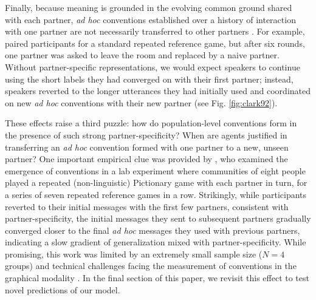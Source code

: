 Finally, because meaning is grounded in the evolving common ground shared with each partner, \emph{ad hoc} conventions established over a history of interaction with one partner are not necessarily transferred to other partners \cite{metzing_when_2003,weber_cultural_2003,horton_revisiting_2016}. 
For example,  paired participants for a standard repeated reference game, but after six rounds, one partner was asked to leave the room and replaced by a naive partner. 
Without partner-specific representations, we would expect speakers to continue using the short labels they had converged on with their first partner; instead, speakers reverted to the longer utterances they had initially used and coordinated on new \emph{ad hoc} conventions with their new partner (see Fig. \ref{fig:clark92}).

These effects raise a third puzzle: how do population-level conventions form in the presence of such strong partner-specificity?
When are agents justified in transferring an \emph{ad hoc} convention formed with one partner to a new, unseen partner? 
One important empirical clue was provided by , who examined the emergence of conventions in a lab experiment where communities of eight people played a repeated (non-linguistic) Pictionary game with each partner in turn, for a series of seven repeated reference games in a row. 
Strikingly, while participants reverted to their initial messages with the first few partners, consistent with partner-specificity, the initial messages they sent to subsequent partners gradually converged closer to the final \emph{ad hoc} messages they used with previous partners, indicating a slow gradient of generalization mixed with partner-specificity.
While promising, this work was limited by an extremely small sample size ($N = 4$ groups) and technical challenges facing the measurement of conventions in the graphical modality \cite<but see>{hawkins2019disentangling}.
In the final section of this paper, we revisit this effect to test novel predictions of our model. 













